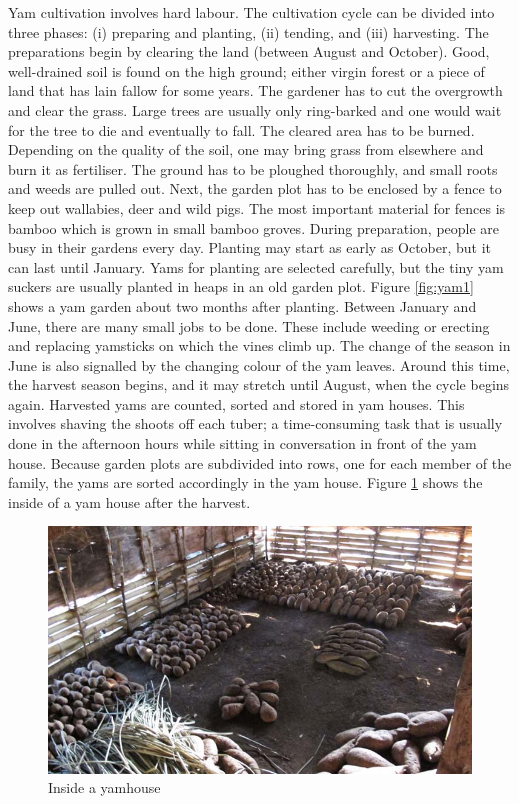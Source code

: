 Yam cultivation involves hard labour. The cultivation cycle can be divided into three phases: (i) preparing and planting, (ii) tending, and (iii) harvesting. The preparations begin by clearing the land (between August and October). Good, well-drained soil is found on the high ground; either virgin forest or a piece of land that has lain fallow for some years. The gardener has to cut the overgrowth and clear the grass. Large trees are usually only ring-barked and one would wait for the tree to die and eventually to fall. The cleared area has to be burned. Depending on the quality of the soil, one may bring grass from elsewhere and burn it as fertiliser. The ground has to be ploughed thoroughly, and small roots and weeds are pulled out. Next, the garden plot has to be enclosed by a fence to keep out wallabies, deer and wild pigs. The most important material for fences is bamboo which is grown in small bamboo groves. During preparation, people are busy in their gardens every day. Planting may start as early as October, but it can last until January. Yams for planting are selected carefully, but the tiny yam suckers are usually planted in heaps in an old garden plot. Figure \ref{fig:yam1} shows a yam garden about two months after planting. Between January and June, there are many small jobs to be done. These include weeding or erecting and replacing yamsticks on which the vines climb up. The change of the season in June is also signalled by the changing colour of the yam leaves. Around this time, the harvest season begins, and it may stretch until August, when the cycle begins again. Harvested yams are counted, sorted and stored in yam houses. This involves shaving the shoots off each tuber; a time-consuming task that is usually done in the afternoon hours while sitting in conversation in front of the yam house. Because garden plots are subdivided into rows, one for each member of the family, the yams are sorted accordingly in the yam house. Figure \ref{fig:yam2} shows the inside of a yam house after the harvest.

\begin{figure}
  
    \includegraphics[width=.9\textwidth]{figures/yam2.jpg}
  \caption[Inside a yamhouse]{Inside a yamhouse}
  \label{fig:yam2}
\end{figure}

